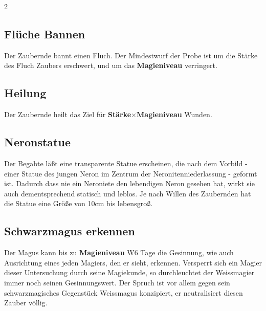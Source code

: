 \begin{multicols*}{2}
\subsection{Flüche Bannen}

Der Zaubernde bannt einen Fluch. Der Mindestwurf der Probe ist um die Stärke des Fluch Zaubers erschwert, und um das \textbf{Magieniveau} verringert.



\subsection{Heilung}

Der Zaubernde heilt das Ziel für \textbf{Stärke}×\textbf{Magieniveau} Wunden.



\subsection{Neronstatue}

Der Begabte läßt eine transparente Statue erscheinen, die nach dem Vorbild - einer Statue des jungen Neron im Zentrum der Neronitenniederlassung - geformt ist. Dadurch dass nie ein Neroniete den lebendigen Neron gesehen hat, wirkt sie auch dementsprechend statisch und leblos. Je nach Willen des Zaubernden hat die Statue eine Größe von 10cm bis lebensgroß.



\subsection{Schwarzmagus erkennen}

Der Magus kann bis zu \textbf{Magieniveau} W6 Tage die Gesinnung, wie auch Ausrichtung eines jeden Magiers, den er sieht, erkennen. Versperrt sich ein Magier dieser Untersuchung durch seine Magiekunde, so durchleuchtet der Weissmagier immer noch seinen Gesinnungswert. Der Spruch ist vor allem gegen sein schwarzmagisches Gegenstück Weissmagus konzipiert, er neutralisiert diesen Zauber völlig.




\end{multicols*}
